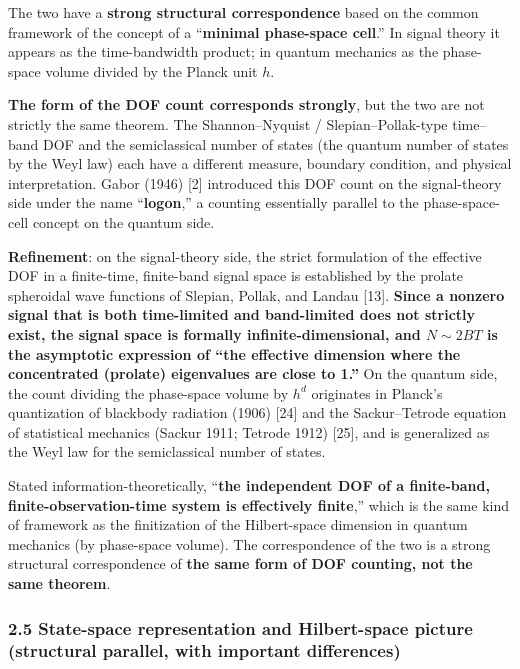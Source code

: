 \documentclass[
]{article}
\begin{document}
The two have a \textbf{strong structural correspondence} based on the
common framework of the concept of a ``\textbf{minimal phase-space
cell}.'' In signal theory it appears as the time-bandwidth product; in
quantum mechanics as the phase-space volume divided by the Planck unit
\(h\).

\textbf{The form of the DOF count corresponds strongly}, but the two are
not strictly the same theorem. The Shannon--Nyquist /
Slepian--Pollak-type time--band DOF and the semiclassical number of
states (the quantum number of states by the Weyl law) each have a
different measure, boundary condition, and physical interpretation.
Gabor (1946) {[}2{]} introduced this DOF count on the signal-theory side
under the name ``\textbf{logon},'' a counting essentially parallel to
the phase-space-cell concept on the quantum side.

\textbf{Refinement}: on the signal-theory side, the strict formulation
of the effective DOF in a finite-time, finite-band signal space is
established by the prolate spheroidal wave functions of Slepian, Pollak,
and Landau {[}13{]}. \textbf{Since a nonzero signal that is both
time-limited and band-limited does not strictly exist, the signal space
is formally infinite-dimensional, and \(N\sim 2BT\) is the asymptotic
expression of ``the effective dimension where the concentrated (prolate)
eigenvalues are close to 1.''} On the quantum side, the count dividing
the phase-space volume by \(h^d\) originates in Planck's quantization of
blackbody radiation (1906) {[}24{]} and the Sackur--Tetrode equation of
statistical mechanics (Sackur 1911; Tetrode 1912) {[}25{]}, and is
generalized as the Weyl law for the semiclassical number of states.

Stated information-theoretically, ``\textbf{the independent DOF of a
finite-band, finite-observation-time system is effectively finite},''
which is the same kind of framework as the finitization of the
Hilbert-space dimension in quantum mechanics (by phase-space volume).
The correspondence of the two is a strong structural correspondence of
\textbf{the same form of DOF counting, not the same theorem}.

\subsubsection{2.5 State-space representation and Hilbert-space picture
(structural parallel, with important
differences)}\label{state-space-representation-and-hilbert-space-picture-structural-parallel-with-important-differences}
\end{document}
